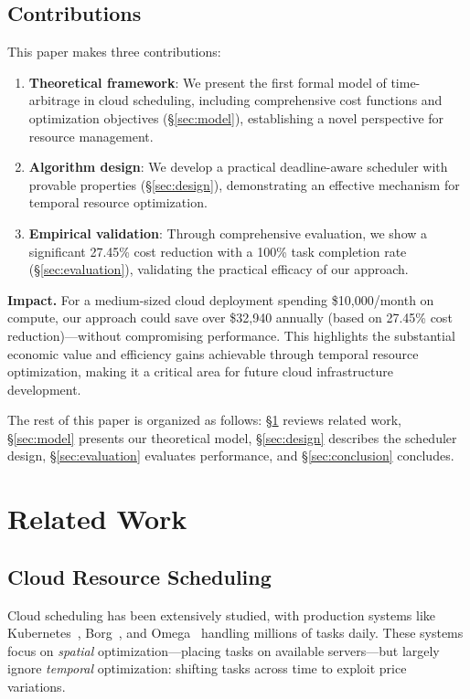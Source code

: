 \documentclass[10pt,conference]{IEEEtran}
\begin{document}
\subsection{Contributions}

This paper makes three contributions:
\begin{enumerate}
    \item \textbf{Theoretical framework}: We present the first formal model of time-arbitrage in cloud scheduling, including comprehensive cost functions and optimization objectives (\S\ref{sec:model}), establishing a novel perspective for resource management.
    \item \textbf{Algorithm design}: We develop a practical deadline-aware scheduler with provable properties (\S\ref{sec:design}), demonstrating an effective mechanism for temporal resource optimization.
    \item \textbf{Empirical validation}: Through comprehensive evaluation, we show a significant 27.45\% cost reduction with a 100\% task completion rate (\S\ref{sec:evaluation}), validating the practical efficacy of our approach.
\end{enumerate}

\textbf{Impact.} For a medium-sized cloud deployment spending \$10,000/month on compute, our approach could save over \$32,940 annually (based on 27.45\% cost reduction)—without compromising performance. This highlights the substantial economic value and efficiency gains achievable through temporal resource optimization, making it a critical area for future cloud infrastructure development.

The rest of this paper is organized as follows: \S\ref{sec:related} reviews related work, \S\ref{sec:model} presents our theoretical model, \S\ref{sec:design} describes the scheduler design, \S\ref{sec:evaluation} evaluates performance, and \S\ref{sec:conclusion} concludes.

\section{Related Work}
\label{sec:related}

\subsection{Cloud Resource Scheduling}

Cloud scheduling has been extensively studied, with production systems like Kubernetes~\cite{kubernetes2025}, Borg~\cite{verma2015large}, and Omega~\cite{tumanov2016omega} handling millions of tasks daily. These systems focus on \textit{spatial} optimization—placing tasks on available servers—but largely ignore \textit{temporal} optimization: shifting tasks across time to exploit price variations.
\end{document}
